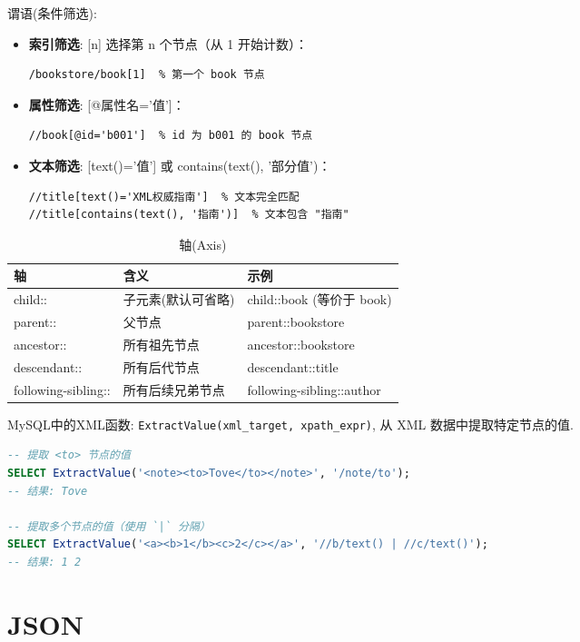 谓语(条件筛选):
\begin{itemize}
    \item \textbf{索引筛选}: [n] 选择第 n 个节点（从 1 开始计数）：
    \begin{verbatim}
/bookstore/book[1]  % 第一个 book 节点
    \end{verbatim}
    \item \textbf{属性筛选}: [@属性名='值']：
    \begin{verbatim}
//book[@id='b001']  % id 为 b001 的 book 节点
    \end{verbatim}
    \item \textbf{文本筛选}: [text()='值'] 或 contains(text(), '部分值')：
    \begin{verbatim}
//title[text()='XML权威指南']  % 文本完全匹配
//title[contains(text(), '指南')]  % 文本包含 "指南"
    \end{verbatim}
\end{itemize}

\begin{table}[H]
    \centering\begin{tabular}{|l|l|l|}
        \hline
        \textbf{轴} & \textbf{含义} & \textbf{示例} \\
        \hline
        child:: & 子元素(默认可省略) & child::book (等价于 book) \\
        \hline
        parent:: & 父节点 & parent::bookstore \\
        \hline
        ancestor:: & 所有祖先节点 & ancestor::bookstore \\
        \hline
        descendant:: & 所有后代节点 & descendant::title \\
        \hline
        following-sibling:: & 所有后续兄弟节点 & following-sibling::author \\
        \hline
    \end{tabular}
    \caption{轴(Axis)}
\end{table}


MySQL中的XML函数: \verb|ExtractValue(xml_target, xpath_expr)|, 从 XML 数据中提取特定节点的值.
\begin{lstlisting}[language=SQL]
-- 提取 <to> 节点的值
SELECT ExtractValue('<note><to>Tove</to></note>', '/note/to');
-- 结果: Tove

-- 提取多个节点的值（使用 `|` 分隔）
SELECT ExtractValue('<a><b>1</b><c>2</c></a>', '//b/text() | //c/text()');
-- 结果: 1 2
\end{lstlisting}

\section{JSON}

